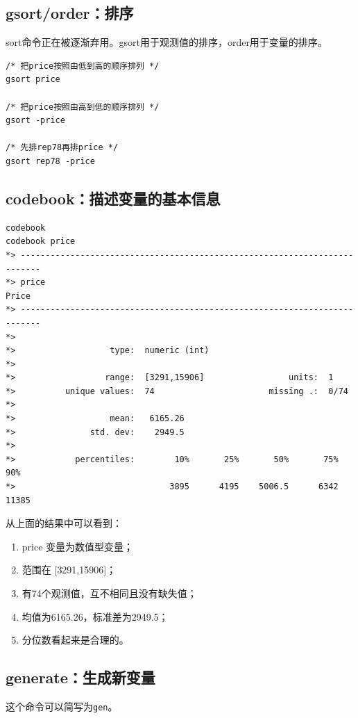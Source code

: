 \subsection{gsort/order：排序}

sort命令正在被逐渐弃用。gsort用于观测值的排序，order用于变量的排序。

\begin{lstlisting}
/* 把price按照由低到高的顺序排列 */
gsort price

/* 把price按照由高到低的顺序排列 */
gsort -price

/* 先排rep78再排price */
gsort rep78 -price
\end{lstlisting}

\subsection{codebook：描述变量的基本信息}

\begin{lstlisting}
codebook
codebook price
*> --------------------------------------------------------------------------
*> price                                                               Price
*> --------------------------------------------------------------------------
*>
*>                   type:  numeric (int)
*>
*>                  range:  [3291,15906]                 units:  1
*>          unique values:  74                       missing .:  0/74
*>
*>                   mean:   6165.26
*>               std. dev:    2949.5
*>
*>            percentiles:        10%       25%       50%       75%       90%
*>                               3895      4195    5006.5      6342     11385
\end{lstlisting}

从上面的结果中可以看到：

\begin{enumerate}
\item price 变量为数值型变量；
\item 范围在 {[}3291,15906{]}；
\item 有74个观测值，互不相同且没有缺失值；
\item 均值为6165.26，标准差为2949.5；
\item 分位数看起来是合理的。
\end{enumerate}

\subsection{generate：生成新变量}
这个命令可以简写为\texttt{gen}。

